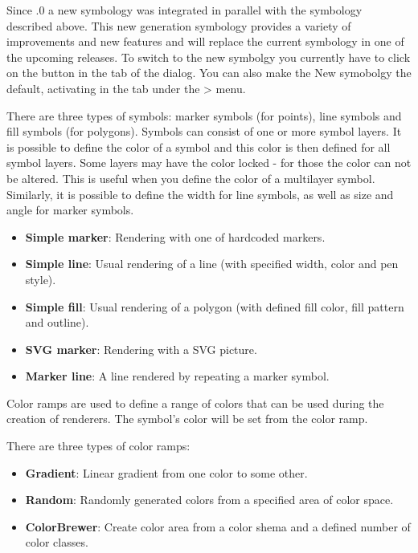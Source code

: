 Since .0  a new symbology was integrated in parallel with the symbology
described above. This new generation symbology provides a variety of improvements and
new features and will replace the current symbology in one of the upcoming releases.
To switch to the new symbolgy you currently have to click on the  button in the  tab of the  dialog. You can
also make the New symobolgy the default, activating  in the  tab under the  >  menu.


There are three types of symbols: marker symbols (for points), line symbols and
fill symbols (for polygons). Symbols can consist of one or more symbol layers. It
is possible to define the color of a symbol and this color is then defined for all
symbol layers. Some layers may have the color locked - for those the color can not
be altered. This is useful when you define the color of a multilayer symbol.
Similarly, it is possible to define the width for line symbols, as well as size and
angle for marker symbols.


\begin{itemize}[label=--]
\item \textbf{Simple marker}: Rendering with one of hardcoded markers.
\item \textbf{Simple line}: Usual rendering of a line (with specified
width, color and pen style).
\item \textbf{Simple fill}: Usual rendering of a polygon (with defined
fill color, fill pattern and outline).
\item \textbf{SVG marker}: Rendering with a SVG picture.
\item \textbf{Marker line}: A line rendered by repeating a marker symbol.
\end{itemize}


Color ramps are used to define a range of colors that can be used during
the creation of renderers. The symbol's color will be set from the color ramp.

There are three types of color ramps:

\begin{itemize}[label=--]
\item \textbf{Gradient}: Linear gradient from one color to some other.
\item \textbf{Random}: Randomly generated colors from a specified area of
color space.
\item \textbf{ColorBrewer}: Create color area from a color shema and a defined
number of color classes.
\end{itemize}

